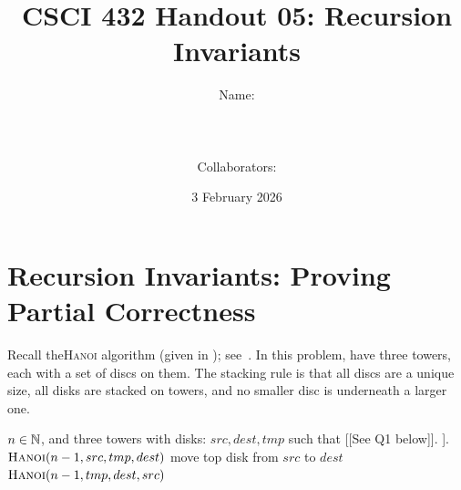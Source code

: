 \documentclass{article}
\title{CSCI 432 Handout 05: Recursion Invariants}
\author{Name: \rule{3in}{0.15mm} \\~\\
    Collaborators: \rule{3in}{0.15mm} }
\date{3 February 2026}
\begin{document}
\maketitle

\section*{Recursion Invariants: Proving Partial Correctness}

Recall the\textsc{Hanoi} algorithm (given in );
see~\cite[Ch.~1]{textbook}.
In this problem, have three towers, each with a set of discs on them. The
stacking rule is that all discs are a unique size, all disks are stacked on
towers, and no smaller disc is underneath a larger one.

\begin{algorithm}[h!]
    \caption{$\textsc{Hanoi}(n,src,dest,tmp)$}\label{alg:hanoi}
    \begin{algorithmic}[1]
        \REQUIRE $n \in {\mathbb N}$, and three towers with disks: $src,dest,tmp$
        such that [[See Q1 below]].
        \ENSURE [[See Q2 below]].
        \label{algln:certificate:ifdirs}
            \STATE $\textsc{Hanoi}(n-1,src,tmp,dest)$
            \STATE move top disk from $src$ to $dest$
            \STATE $\textsc{Hanoi}(n-1,tmp,dest,src)$
        \ENDIF
    \end{algorithmic}
\end{algorithm}
\end{document}
